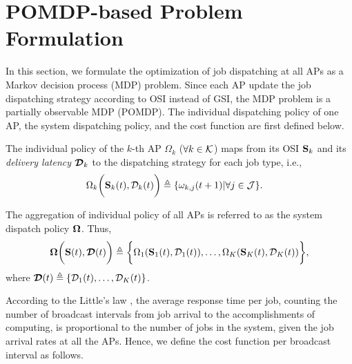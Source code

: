 \section{POMDP-based Problem Formulation}
\label{sec:formulation}
In this section, we formulate the optimization of job dispatching at all APs as a Markov decision process (MDP) problem.
Since each AP update the job dispatching strategy according to OSI instead of GSI, the MDP problem is a partially observable MDP (POMDP).
The individual dispatching policy of one AP, the system dispatching policy, and the cost function are first defined below.

\begin{definition}
    The individual policy of the $k$-th AP $\Omega_{k}$ ($\forall k \in\mathcal{K}$) maps from its OSI $\mathbf{S}_{k}$ and its \emph{delivery latency} $\boldsymbol{\mathcal{D}}_{k}$ to the dispatching strategy for each job type, i.e.,
    \begin{align}
        &\Omega_{k} \bigg( \mathbf{S}_{k}(t), \mathcal{D}_{k}(t) \bigg)
        \triangleq \{\omega_{k,j}(t+1)|\forall j\in\mathcal{J}\}.
        \label{def:action}
    \end{align}

    The aggregation of individual policy of all APs is referred to as the system dispatch policy $\boldsymbol{\Omega}$.
    Thus,
    \begin{align}
        \boldsymbol{\Omega}\bigg( \mathbf{S}(t), \boldsymbol{\mathcal{D}}(t) \bigg) \triangleq \bigg\{
            \Omega_{1}(\mathbf{S}_{1}(t), \mathcal{D}_{1}(t)), \dots, \Omega_{K}(\mathbf{S}_{K}(t),\mathcal{D}_{K}(t))
        \bigg\},
    \end{align}
    where $\boldsymbol{\mathcal{D}}(t) \triangleq \{ \mathcal{D}_{1}(t), \dots, \mathcal{D}_{K}(t) \}$.
\end{definition}

According to the Little's law \cite{Little1961}, the average response time per job, counting the number of broadcast intervals from job arrival to the accomplishments of computing, is proportional to the number of jobs in the system, given the job arrival rates at all the APs.
Hence, we define the cost function per broadcast interval as follows.

